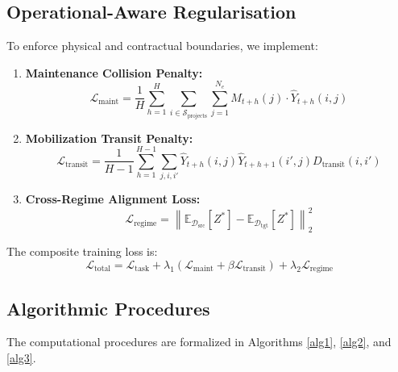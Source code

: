 \documentclass[pdflatex,sn-mathphys,Numbered]{sn-jnl}%
\begin{document}
\subsection{Operational-Aware Regularisation}
To enforce physical and contractual boundaries, we implement:
\begin{enumerate}
\item \textbf{Maintenance Collision Penalty:}
\begin{equation}
\mathcal{L}_{\text{maint}} = \frac{1}{H} \sum_{h=1}^H \sum_{i \in \mathcal{S}_{\text{projects}}} \sum_{j=1}^{N_e} M_{t+h}(j) \cdot \widehat{Y}_{t+h}(i, j) \label{eq9}
\end{equation}
\item \textbf{Mobilization Transit Penalty:}
\begin{equation}
\mathcal{L}_{\text{transit}} = \frac{1}{H-1} \sum_{h=1}^{H-1} \sum_{j, i, i'} \widehat{Y}_{t+h}(i, j) \widehat{Y}_{t+h+1}(i', j) D_{\text{transit}}(i, i') \label{eq10}
\end{equation}
\item \textbf{Cross-Regime Alignment Loss:}
\begin{equation}
\mathcal{L}_{\text{regime}} = \left\| \mathbb{E}_{\mathcal{D}_{\text{src}}}[Z^*] - \mathbb{E}_{\mathcal{D}_{\text{tgt}}}[Z^*] \right\|_2^2 \label{eq11}
\end{equation}
\end{enumerate}
The composite training loss is:
\begin{equation}
\mathcal{L}_{\text{total}} = \mathcal{L}_{\text{task}} + \lambda_1 \left(\mathcal{L}_{\text{maint}} + \beta \mathcal{L}_{\text{transit}}\right) + \lambda_2 \mathcal{L}_{\text{regime}} \label{eq12}
\end{equation}

\subsection{Algorithmic Procedures}
The computational procedures are formalized in Algorithms \ref{alg1}, \ref{alg2}, and \ref{alg3}.
\end{document}
